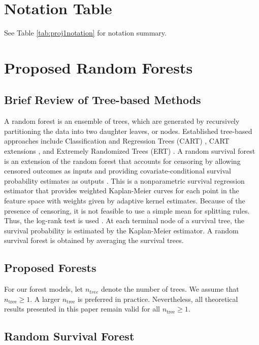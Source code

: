 %
%

\section{Notation Table}
\label{sec:sm_notation_table}
See Table \ref{tab:proj1notation} for notation summary.
 
\section{Proposed Random Forests}
\subsection{Brief Review of Tree-based Methods}
A random forest is an ensemble of trees, which are generated by
recursively partitioning the data into two daughter leaves, or nodes. Established tree-based approaches include Classification
and Regression Trees (CART) \citep{breiman1984classification}, 
CART extensions \citep{breiman1984classification}, 
and Extremely Randomized Trees (ERT) \citep{geurts2006extremely}.
A random survival forest is an extension of the random forest that accounts for censoring by allowing censored outcomes as inputs and providing covariate-conditional survival probability estimates as outputs \citep{ishwaran_random_2008}. This is a nonparametric survival regression estimator that provides weighted Kaplan-Meier curves for each point in the feature space with weights given by adaptive kernel estimates. Because of the presence of censoring, it is not feasible to use a simple mean for splitting rules. Thus, the log-rank test is used \citep{peto1972,gehan1965,tarone1977}. At each terminal node of a survival tree, the survival probability is estimated by the Kaplan-Meier estimator. A random survival forest is obtained by averaging the survival trees.

\ifnum{}

\else
{
\fontsize{9}{12}\selectfont

}
 \fi

{
\subsection{Proposed Forests}
For our forest models, let $n_{tree}$ denote the number of trees. We assume that \(n_{\text{tree}} \ge 1\). A larger \(n_{\text{tree}}\) is preferred in practice. Nevertheless, all theoretical results presented in this paper remain valid for all \(n_{\text{tree}} \ge 1\).

\subsection*{Random Survival Forest}

}

